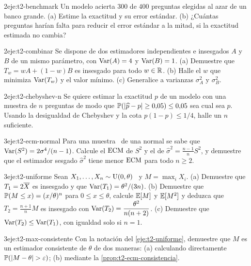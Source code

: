 \begin{ejercicio}{2}{eje:t2-benchmark}
Un modelo acierta $300$ de $400$ preguntas elegidas al azar de un banco grande. (a) Estime la exactitud y su error estándar. (b) ¿Cuántas preguntas harían falta para reducir el error estándar a la mitad, si la exactitud estimada no cambia?
\end{ejercicio}

\begin{ejercicio}{2}{eje:t2-combinar}
Se dispone de dos estimadores independientes e insesgados $A$ y $B$ de un mismo parámetro, con $\operatorname{Var}(A)=4$ y $\operatorname{Var}(B)=1$. (a) Demuestre que $T_w=wA+(1-w)B$ es insesgado para todo $w\in\mathbb{R}$. (b) Halle el $w$ que minimiza $\operatorname{Var}(T_w)$ y el valor mínimo. (c) Generalice a varianzas $\sigma_A^{2}$ y $\sigma_B^{2}$.
\end{ejercicio}

\begin{ejercicio}{2}{eje:t2-chebyshev-n}
Se quiere estimar la exactitud $p$ de un modelo con una muestra de $n$ preguntas de modo que $\mathbb{P}(\lvert\widehat p-p\rvert\ge0{,}05)\le0{,}05$ sea cual sea $p$. Usando la desigualdad de Chebyshev y la cota $p(1-p)\le1/4$, halle un $n$ suficiente.
\end{ejercicio}

\begin{ejercicio}{3}{eje:t2-ecm-normal}
Para una muestra \iid\ de una normal se sabe que $\operatorname{Var}(S^{2})=2\sigma^{4}/(n-1)$. Calcule el $\operatorname{ECM}$ de $S^{2}$ y el de $\widehat\sigma^{2}=\frac{n-1}{n}S^{2}$, y demuestre que el estimador sesgado $\widehat\sigma^{2}$ tiene menor $\operatorname{ECM}$ para todo $n\ge2$.
\end{ejercicio}

\begin{ejercicio}{3}{eje:t2-uniforme}
Sean $X_1,\dots,X_n\sim\operatorname{U}(0,\theta)$ \iid\ y $M=\max_iX_i$. (a) Demuestre que $T_1=2\overline{X}$ es insesgado y que $\operatorname{Var}(T_1)=\theta^{2}/(3n)$. (b) Demuestre que $\mathbb{P}(M\le x)=(x/\theta)^{n}$ para $0\le x\le\theta$, calcule $\mathbb{E}[M]$ y $\mathbb{E}[M^{2}]$ y deduzca que $T_2=\frac{n+1}{n}M$ es insesgado con $\operatorname{Var}(T_2)=\dfrac{\theta^{2}}{n(n+2)}$. (c) Demuestre que $\operatorname{Var}(T_2)\le\operatorname{Var}(T_1)$, con igualdad solo si $n=1$.
\end{ejercicio}

\begin{ejercicio}{3}{eje:t2-max-consistente}
Con la notación del \cref{eje:t2-uniforme}, demuestre que $M$ es un estimador consistente de $\theta$ de dos maneras: (a) calculando directamente $\mathbb{P}(\lvert M-\theta\rvert>\varepsilon)$; (b) mediante la \cref{prop:t2-ecm-consistencia}.
\end{ejercicio}

